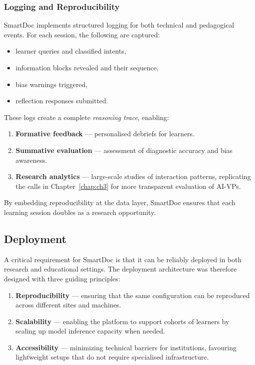 \subsubsection{Logging and Reproducibility}

SmartDoc implements structured logging for both technical and pedagogical events.
For each session, the following are captured:
\begin{itemize}
    \item learner queries and classified intents,
    \item information blocks revealed and their sequence,
    \item bias warnings triggered,
    \item reflection responses submitted.
\end{itemize}

These logs create a complete \emph{reasoning trace}, enabling:
\begin{enumerate}
    \item \textbf{Formative feedback} --- personalised debriefs for learners.
    \item \textbf{Summative evaluation} --- assessment of diagnostic accuracy and
    bias awareness.
    \item \textbf{Research analytics} --- large-scale studies of interaction patterns,
    replicating the calls in Chapter~\ref{chap:ch3} for more transparent evaluation
    of AI-VPs.
\end{enumerate}
By embedding reproducibility at the data layer, SmartDoc ensures that each learning
session doubles as a research opportunity.

\subsection{Deployment}
\label{sec:deployment}

A critical requirement for SmartDoc is that it can be reliably deployed in both
research and educational settings. The deployment architecture was therefore designed
with three guiding principles:

\begin{enumerate}
    \item \textbf{Reproducibility} — ensuring that the same configuration can be
    reproduced across different sites and machines.
    \item \textbf{Scalability} — enabling the platform to support cohorts of learners
    by scaling up model inference capacity when needed.
    \item \textbf{Accessibility} — minimizing technical barriers for institutions,
    favouring lightweight setups that do not require specialised infrastructure.
\end{enumerate}

